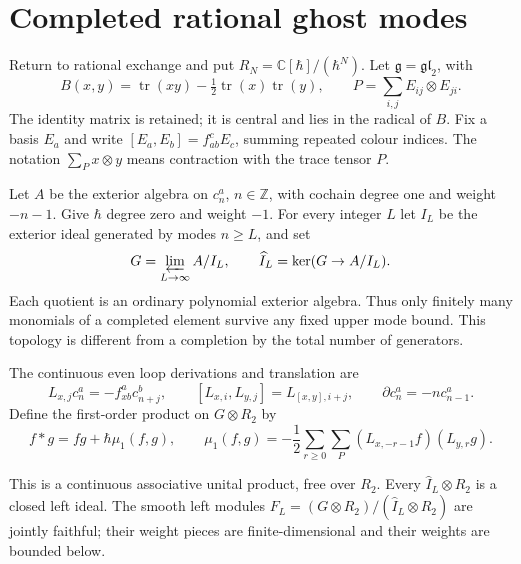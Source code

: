 \section{Completed rational ghost modes}
\label{cyquant:sec:ghost-modes}

Return to rational exchange and put
$R_N=\mathbb C[\hbar]/(\hbar^N)$.  Let
$\mathfrak g=\mathfrak{gl}_2$, with
\[
 B(x,y)=\operatorname{tr}(xy)-\tfrac12\operatorname{tr}(x)
                                      \operatorname{tr}(y),
 \qquad P=\sum_{i,j}E_{ij}\otimes E_{ji}.
\]
The identity matrix is retained; it is central and lies in the radical
of $B$.  Fix a basis $E_a$ and write $[E_a,E_b]=f_{ab}^cE_c$,
summing repeated colour indices.  The notation $\sum_Px\otimes y$
means contraction with the trace tensor $P$.

Let $A$ be the exterior algebra on $c_n^a$, $n\in\mathbb Z$, with
cochain degree one and weight $-n-1$.  Give $\hbar$ degree zero and
weight $-1$.  For every integer $L$ let $I_L$ be the exterior ideal
generated by modes $n\geq L$, and set
\[
 G=\varprojlim_{L\to\infty}A/I_L,\qquad
 \widehat I_L=\ker(G\to A/I_L).
\]
Each quotient is an ordinary polynomial exterior algebra.  Thus only
finitely many monomials of a completed element survive any fixed upper
mode bound.  This topology is different from a completion by the total
number of generators.

The continuous even loop derivations and translation are
\[
 L_{x,j}c_n^a=-f_{xb}^a c_{n+j}^b,
 \qquad [L_{x,i},L_{y,j}]=L_{[x,y],i+j},
 \qquad \partial c_n^a=-nc_{n-1}^a.
\]
Define the first-order product on $G\otimes R_2$ by
\begin{equation}\label{cyquant:eq:ghost-product}
 f*g=fg+\hbar\mu_1(f,g),\qquad
 \mu_1(f,g)=-\frac12\sum_{r\geq0}\sum_P
            (L_{x,-r-1}f)(L_{y,r}g).
\end{equation}

\begin{proposition}\label{cyquant:prop:ghost-completion}
This is a continuous associative unital product, free over $R_2$.
Every $\widehat I_L\otimes R_2$ is a closed left ideal.  The smooth
left modules
$F_L=(G\otimes R_2)/(\widehat I_L\otimes R_2)$ are jointly faithful;
their weight pieces are finite-dimensional and their weights are bounded
below.
\end{proposition}


